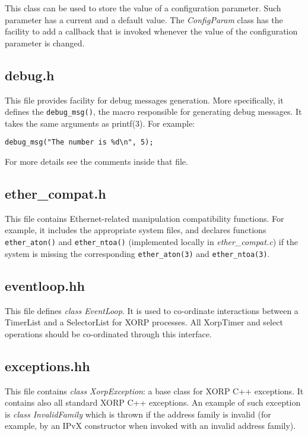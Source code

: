 \documentclass[11pt]{article}
\begin{document}
This class can be used to store the value of a configuration parameter.
Such parameter has a current and a default value.
The \emph{ConfigParam} class has the facility to add a callback that is
invoked whenever the value of the configuration parameter is changed.

\subsection{debug.h}

This file provides facility for debug messages generation.
More specifically, it defines the \verb=debug_msg()=, the macro
responsible for generating debug messages.
It takes the same arguments as printf(3). For example:

\begin{verbatim}
debug_msg("The number is %d\n", 5);
\end{verbatim}

For more details see the comments inside that file.

\subsection{ether\_compat.h}

This file contains Ethernet-related manipulation compatibility
functions. For example, it includes the appropriate system files,
and declares functions \verb=ether_aton()= and \verb=ether_ntoa()=
(implemented locally in \emph{ether\_compat.c}) if the system is missing
the corresponding \verb=ether_aton(3)= and \verb=ether_ntoa(3)=.

\subsection{eventloop.hh}

This file defines \emph{class EventLoop}.
It is used to co-ordinate interactions between a TimerList and a
SelectorList for XORP processes.  All XorpTimer and select operations
should be co-ordinated through this interface.

\subsection{exceptions.hh}

This file contains \emph{class XorpException}: a base class for XORP C++
exceptions. It contains also all standard XORP C++ exceptions.
An example of such exception is \emph{class InvalidFamily} which is
thrown if the address family is invalid (for example, by an IPvX
constructor when invoked with an invalid address family).
\end{document}
